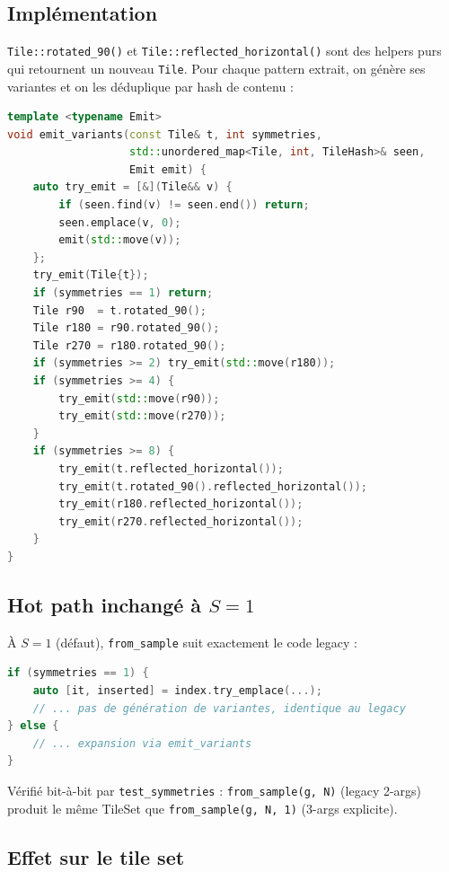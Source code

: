\subsection{Implémentation}

\texttt{Tile::rotated\_90()} et \texttt{Tile::reflected\_horizontal()} sont des helpers purs qui retournent un nouveau \texttt{Tile}. Pour chaque pattern extrait, on génère ses variantes et on les déduplique par hash de contenu :

\begin{lstlisting}[language=C++]
template <typename Emit>
void emit_variants(const Tile& t, int symmetries,
                   std::unordered_map<Tile, int, TileHash>& seen,
                   Emit emit) {
    auto try_emit = [&](Tile&& v) {
        if (seen.find(v) != seen.end()) return;
        seen.emplace(v, 0);
        emit(std::move(v));
    };
    try_emit(Tile{t});
    if (symmetries == 1) return;
    Tile r90  = t.rotated_90();
    Tile r180 = r90.rotated_90();
    Tile r270 = r180.rotated_90();
    if (symmetries >= 2) try_emit(std::move(r180));
    if (symmetries >= 4) {
        try_emit(std::move(r90));
        try_emit(std::move(r270));
    }
    if (symmetries >= 8) {
        try_emit(t.reflected_horizontal());
        try_emit(t.rotated_90().reflected_horizontal());
        try_emit(r180.reflected_horizontal());
        try_emit(r270.reflected_horizontal());
    }
}
\end{lstlisting}

\subsection{Hot path inchangé à $S=1$}

À $S = 1$ (défaut), \texttt{from\_sample} suit exactement le code legacy :

\begin{lstlisting}[language=C++]
if (symmetries == 1) {
    auto [it, inserted] = index.try_emplace(...);
    // ... pas de génération de variantes, identique au legacy
} else {
    // ... expansion via emit_variants
}
\end{lstlisting}

Vérifié bit-à-bit par \texttt{test\_symmetries} : \texttt{from\_sample(g, N)} (legacy 2-args) produit le même TileSet que \texttt{from\_sample(g, N, 1)} (3-args explicite).

\subsection{Effet sur le tile set}

